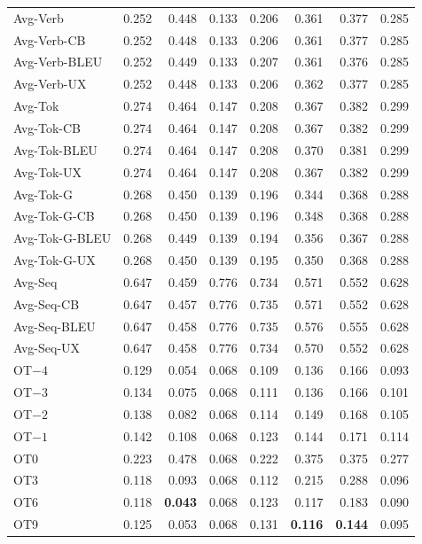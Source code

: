 {\begin{longtable}{@{}lrrrrrrr@{}}
\addlinespace
Avg-Verb & 0.252 & 0.448 & 0.133 & 0.206 & 0.361 & 0.377 & 0.285 \\
Avg-Verb-CB & 0.252 & 0.448 & 0.133 & 0.206 & 0.361 & 0.377 & 0.285 \\
Avg-Verb-BLEU & 0.252 & 0.449 & 0.133 & 0.207 & 0.361 & 0.376 & 0.285 \\
Avg-Verb-UX & 0.252 & 0.448 & 0.133 & 0.206 & 0.362 & 0.377 & 0.285 \\
\addlinespace
Avg-Tok & 0.274 & 0.464 & 0.147 & 0.208 & 0.367 & 0.382 & 0.299 \\
Avg-Tok-CB & 0.274 & 0.464 & 0.147 & 0.208 & 0.367 & 0.382 & 0.299 \\
Avg-Tok-BLEU & 0.274 & 0.464 & 0.147 & 0.208 & 0.370 & 0.381 & 0.299 \\
Avg-Tok-UX & 0.274 & 0.464 & 0.147 & 0.208 & 0.367 & 0.382 & 0.299 \\
Avg-Tok-G & 0.268 & 0.450 & 0.139 & 0.196 & 0.344 & 0.368 & 0.288 \\
Avg-Tok-G-CB & 0.268 & 0.450 & 0.139 & 0.196 & 0.348 & 0.368 & 0.288 \\
Avg-Tok-G-BLEU & 0.268 & 0.449 & 0.139 & 0.194 & 0.356 & 0.367 & 0.288 \\
Avg-Tok-G-UX & 0.268 & 0.450 & 0.139 & 0.195 & 0.350 & 0.368 & 0.288 \\
\addlinespace
Avg-Seq & 0.647 & 0.459 & 0.776 & 0.734 & 0.571 & 0.552 & 0.628 \\
Avg-Seq-CB & 0.647 & 0.457 & 0.776 & 0.735 & 0.571 & 0.552 & 0.628 \\
Avg-Seq-BLEU & 0.647 & 0.458 & 0.776 & 0.735 & 0.576 & 0.555 & 0.628 \\
Avg-Seq-UX & 0.647 & 0.458 & 0.776 & 0.734 & 0.570 & 0.552 & 0.628 \\
\addlinespace
OT$-4$ & 0.129 & 0.054 & 0.068 & 0.109 & 0.136 & 0.166 & 0.093 \\
OT$-3$ & 0.134 & 0.075 & 0.068 & 0.111 & 0.136 & 0.166 & 0.101 \\
OT$-2$ & 0.138 & 0.082 & 0.068 & 0.114 & 0.149 & 0.168 & 0.105 \\
OT$-1$ & 0.142 & 0.108 & 0.068 & 0.123 & 0.144 & 0.171 & 0.114 \\
OT0 & 0.223 & 0.478 & 0.068 & 0.222 & 0.375 & 0.375 & 0.277 \\
OT3 & 0.118 & 0.093 & 0.068 & 0.112 & 0.215 & 0.288 & 0.096 \\
OT6 & 0.118 & \textbf{0.043} & 0.068 & 0.123 & 0.117 & 0.183 & 0.090 \\
OT9 & 0.125 & 0.053 & 0.068 & 0.131 & \textbf{0.116} & \textbf{0.144} & 0.095 \\

\end{longtable}}
